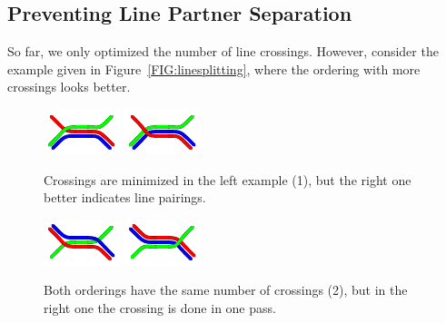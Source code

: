 \documentclass{llncs}
\begin{document}
\subsection{Preventing Line Partner Separation}\label{SEC:separation}
So far, we only optimized the number of line crossings. However, consider the example given in Figure~\ref{FIG:linesplitting}, where the ordering with more crossings looks better.
\begin{figure}
\centering
\begin{minipage}{.48\textwidth}
  \centering
	\includegraphics[angle=270,origin=c,width=.3\textwidth]{render_examples/splitting_example_nonopt.pdf}\hspace{10pt}
	\includegraphics[angle=270,origin=c,width=.3\textwidth]{render_examples/splitting_example.pdf}
	\caption{Crossings are minimized in the left example (1), but the right one better indicates line pairings.}
	\label{FIG:linesplitting}
\end{minipage}%
\hfill
\begin{minipage}{.48\textwidth}
  \centering
	\includegraphics[angle=90,origin=c,width=.3\textwidth]{render_examples/splitting_example2_nonopt.pdf}\hspace{10pt}
	\includegraphics[angle=90,origin=c,width=.3\textwidth]{render_examples/splitting_example2.pdf}
	\caption{Both orderings have the same number of crossings (2), but in the right one the
crossing is done in one pass.}
	\label{FIG:linesplitting2}
\end{minipage}
\end{figure}
\end{document}

